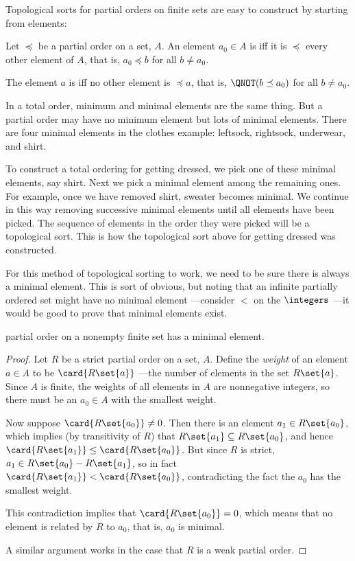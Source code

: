 Topological sorts for partial orders on finite sets are easy to construct
by starting from  elements:

\begin{definition}
Let $\preceq$ be a partial order on a set, $A$.  An element $a_0 \in A$ is
 iff it is $\preceq$ every other element
of $A$, that is, $a_0 \preceq b$ for all $b \neq a_0$.

The element $a$ is  iff no other element
is $\preceq a$, that is, $\QNOT(b \preceq a_0)$ for all $b \neq a_0$.
\end{definition}

In a total order, minimum and minimal elements are the same thing.  But a
partial order may have no minimum element but lots of minimal elements.
There are four minimal elements in the clothes example: leftsock,
rightsock, underwear, and shirt.

To construct a total ordering for getting dressed, we pick one of these
minimal elements, say shirt.  Next we pick a minimal element among the
remaining ones.  For example, once we have removed shirt, sweater becomes
minimal.  We continue in this way removing successive minimal elements
until all elements have been picked.  The sequence of elements in the
order they were picked will be a topological sort.  This is how the
topological sort above for getting dressed was constructed.

For this method of topological sorting to work, we need to be sure there
is always a minimal element.  This is sort of obvious, but noting that an
infinite partially ordered set might have no minimal element ---consider
$<$ on the $\integers$ ---it would be good to prove that minimal
elements exist.

\begin{lemma}\label{finmin}
   partial order on a nonempty finite set has
  a minimal element.

\begin{proof}
Let $R$ be a strict partial order on a set, $A$.  Define the \emph{weight}
of an element $a \in A$ to be $\card{R\set{a}}$ ---the number of elements
in the set $R\set{a}$.  Since $A$ is finite, the weights of all elements
in $A$ are nonnegative integers, so there must be an $a_0 \in A$ with the
smallest weight.

Now suppose $\card{R\set{a_0}} \neq 0$.  Then there is an element $a_1 \in
R\set{a_0}$, which implies (by transitivity of $R$) that $R\set{a_1}
\subseteq R\set{a_0}$, and hence $\card{R\set{a_1}} \leq
\card{R\set{a_0}}$.  But since $R$ is strict, $a_1 \in R\set{a_0} -
R\set{a_1}$, so in fact $\card{R\set{a_1}} < \card{R\set{a_0}}$,
contradicting the fact the $a_0$ has the smallest weight.

This contradiction implies that $\card{R\set{a_0}} = 0$, which means that
no element is related by $R$ to $a_0$, that is, $a_0$ is minimal.

A similar argument works in the case that $R$ is a weak partial order.

\end{proof}
\end{lemma}

